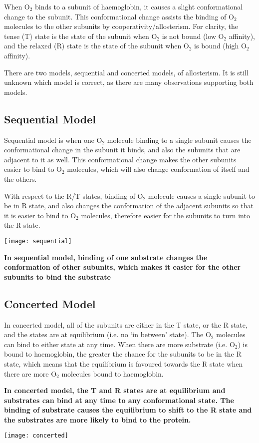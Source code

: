 When O$_2$ binds to a subunit of haemoglobin, it causes a slight conformational change to the subunit.
This conformational change assists the binding of O$_2$ molecules to the other subunits by cooperativity/allosterism.
For clarity, the tense (T) state is the state of the subunit when O$_2$ is not bound (low O$_2$ affinity), and the relaxed (R) state is the state of the subunit when O$_2$ is bound (high O$_2$ affinity).

There are two models, sequential and concerted models, of allosterism.
It is still unknown which model is correct, as there are many observations supporting both models.

\subsection{Sequential Model}

Sequential model is when one O$_2$ molecule binding to a single subunit causes the conformational change in the subunit it binds, and also the subunits that are adjacent to it as well.
This conformational change makes the other subunits easier to bind to O$_2$ molecules, which will also change conformation of itself and the others.

With respect to the R/T states, binding of O$_2$ molecule causes a single subunit to be in R state, and also changes the conformation of the adjacent subunits so that it is easier to bind to O$_2$ molecules, therefore easier for the subunits to turn into the R state.

\begin{center}
\texttt{[image: sequential]}
\end{center}

\textbf{In sequential model, binding of one substrate changes the conformation of other subunits, which makes it easier for the other subunits to bind the substrate}

\subsection{Concerted Model}

In concerted model, all of the subunits are either in the T state, or the R state, and the states are at equilibrium (i.e. no `in between' state).
The O$_2$ molecules can bind to either state at any time.
When there are more substrate (i.e. O$_2$) is bound to haemoglobin, the greater the chance for the subunits to be in the R state, which means that the equilibrium is favoured towards the R state when there are more O$_2$ molecules bound to haemoglobin.

\textbf{ In concerted model, the T and R states are at equilibrium and substrates can bind at any time to any conformational state. The binding of substrate causes the equilibrium to shift to the R state and the substrates are more likely to bind to the protein.}

\begin{center}
\texttt{[image: concerted]}
\end{center}
